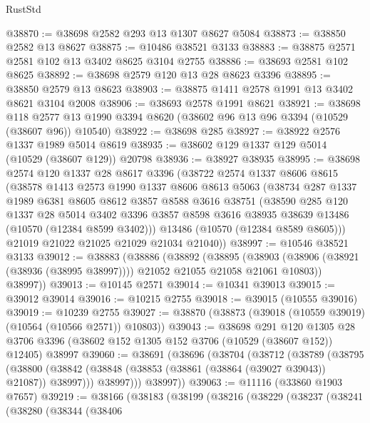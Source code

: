 \begin{lexlean}{RustStd}
\begin{coremodule}
@38870 := @38698 @2582 @293 @13 @1307 @8627 @5084
@38873 := @38850 @2582 @13 @8627
@38875 := @10486 @38521 @3133
@38883 := @38875 @2571 @2581 @102 @13 @3402 @8625 @3104 @2755
@38886 := @38693 @2581 @102 @8625
@38892 := @38698 @2579 @120 @13 @28 @8623 @3396
@38895 := @38850 @2579 @13 @8623
@38903 := @38875 @1411 @2578 @1991 @13 @3402 @8621 @3104 @2008
@38906 := @38693 @2578 @1991 @8621
@38921 := @38698
    @118
    @2577
    @13
    @1990
    @3394
    @8620
    (@38602 @96 @13 @96 @3394 (@10529 (@38607 @96)) @10540)
@38922 := @38698 @285
@38927 := @38922 @2576 @1337 @1989 @5014 @8619
@38935 := @38602 @129 @1337 @129 @5014 (@10529 (@38607 @129)) @20798
@38936 := @38927 @38935
@38995 := @38698
    @2574
    @120
    @1337
    @28
    @8617
    @3396
    (@38722
      @2574
      @1337
      @8606
      @8615
      (@38578
        @1413
        @2573
        @1990
        @1337
        @8606
        @8613
        @5063
        (@38734
          @287
          @1337
          @1989
          @6381
          @8605
          @8612
          @3857
          @8588
          @3616
          @38751
          (@38590
            @285
            @120
            @1337
            @28
            @5014
            @3402
            @3396
            @3857
            @8598
            @3616
            @38935
            @38639
            @13486
            (@10570 (@12384 @8599 @3402)))
          @13486
          (@10570 (@12384 @8589 @8605)))
        @21019
        @21022
        @21025
        @21029
        @21034
        @21040))
@38997 := @10546 @38521 @3133
@39012 := @38883
    (@38886
      (@38892
        (@38895
          (@38903 (@38906 (@38921 (@38936 (@38995 @38997)))) @21052 @21055 @21058 @21061 @10803))
        @38997))
@39013 := @10145 @2571
@39014 := @10341 @39013
@39015 := @39012 @39014
@39016 := @10215 @2755
@39018 := @39015 (@10555 @39016)
@39019 := @10239 @2755
@39027 := @38870 (@38873 (@39018 (@10559 @39019) (@10564 (@10566 @2571)) @10803))
@39043 := @38698
    @291
    @120
    @1305
    @28
    @3706
    @3396
    (@38602 @152 @1305 @152 @3706 (@10529 (@38607 @152)) @12405)
    @38997
@39060 := @38691
    (@38696
      (@38704
        (@38712
          (@38789
            (@38795
              (@38800 (@38842 (@38848 (@38853 (@38861 (@38864 (@39027 @39043)) @21087)) @38997)))
              @38997)))
        @38997))
@39063 := @11116 (@33860 @1903 @7657)
@39219 := @38166
    (@38183
      (@38199
        (@38216
          (@38229
            (@38237
              (@38241
                (@38280
                  (@38344
                    (@38406

\end{coremodule}
\end{lexlean}
